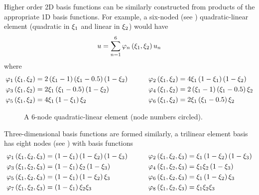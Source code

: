 %    


Higher order 2D basis functions can be similarly constructed from products
of the appropriate 1D basis functions. For example, a six-noded
(see ) quadratic-linear element (quadratic in $\xi_{1}$ and
linear in $\xi_{2}$) would have 
\begin{equation*} u= \displaystyle\sum_{n=1}^{6} 
     \varphi_{n} \left( \xi_{1},\xi_{2} \right)  u_{n}
\end{equation*}
where
  \begin{alignat}{2}
       \varphi_{1} \left( \xi_{1},\xi_{2} \right)   &=
    2\left( \xi_{1}-1 \right)\left( \xi_{1}-0.5 \right)\left( 1-\xi_{2} \right) &\qquad
       \varphi_{2} \left( \xi_{1},\xi_{2} \right)   &= 4\xi_{1}\left( 1-\xi_{1} \right)\left( 1-\xi_{2} \right) \\
       \varphi_{3} \left( \xi_{1},\xi_{2} \right)   &=
    2\xi_{1}\left( \xi_{1}-0.5 \right)\left( 1-\xi_{2} \right) &\qquad
       \varphi_{4} \left( \xi_{1},\xi_{2} \right)   &=
    2\left( \xi_{1}-1 \right)\left( \xi_{1}-0.5 \right)\xi_{2} \\ 
       \varphi_{5} \left( \xi_{1},\xi_{2} \right)   &= 4\xi_{1}\left( 1-\xi_{1} \right)\xi_{2} &\qquad
       \varphi_{6} \left( \xi_{1},\xi_{2} \right)   &= 2\xi_{1}\left( \xi_{1}-0.5 \right)\xi_{2}
  \label{eqn:QLE}
  \end{alignat}



\begin{figure}[htbp] \centering
  
  \caption{A $6$-node quadratic-linear element (node numbers circled).}
  \label{fig:6node}
\end{figure} 

Three-dimensional basis functions are formed similarly, \eg a trilinear
element basis has eight nodes (see ) with basis functions
\begin{alignat}{2}
           \varphi_{1} \left( \xi_{1},\xi_{2},\xi_{3} \right)   &=
        \left( 1-\xi_{1} \right)\left( 1-\xi_{2} \right)\left( 1-\xi_{3} \right) 
        &\qquad    \varphi_{2} \left( \xi_{1},\xi_{2},\xi_{3} \right)  
        &=\xi_{1}\left( 1-\xi_{2} \right)\left( 1-\xi_{3} \right) \\
           \varphi_{3} \left( \xi_{1},\xi_{2},\xi_{3} \right)   &=\left( 1-\xi_{1} \right)\xi_{2}\left( 1-\xi_{3} \right) 
        &\qquad    \varphi_{4} \left( \xi_{1},\xi_{2},\xi_{3} \right)   &=\xi_{1}\xi_{2}\left( 1-\xi_{3} \right) \\
           \varphi_{5} \left( \xi_{1},\xi_{2},\xi_{3} \right)   &=\left( 1-\xi_{1} \right)\left( 1-\xi_{2} \right)\xi_{3} 
        &\qquad    \varphi_{6} \left( \xi_{1},\xi_{2},\xi_{3} \right)   &=\xi_{1}\left( 1-\xi_{2} \right)\xi_{3} \\
           \varphi_{7} \left( \xi_{1},\xi_{2},\xi_{3} \right)   &=\left( 1-\xi_{1} \right)\xi_{2}\xi_{3}          
        &   \varphi_{8} \left( \xi_{1},\xi_{2},\xi_{3} \right)   &=\xi_{1}\xi_{2}\xi_{3}
        \label{eqn:trilinear}
\end{alignat}


